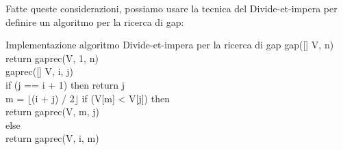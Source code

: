 \begin{problem}
    Fatte queste considerazioni, possiamo usare la tecnica del Divide-et-impera
    per definire un algoritmo per la ricerca di gap:
    \begin{minicode}{Implementazione algoritmo Divide-et-impera per la ricerca di gap}
        \ind{} gap([] V,  n)\\
            return gaprec(V, 1, n)\\

        \ind{} gaprec([] V,  i,  j)\\
            \indf if (j == i + 1) then\hfill{}
                return j\\
            \indf{} m = $\lfloor$(i + j) / 2$\rfloor$\hfill\com{Scelta dell'indice $m\in\,]i,j[$}
            \indf if (V[m] < V[j]) then\\
                return gaprec(V, m, j)\\
            \indf else\\
                return gaprec(V, i, m)
    \end{minicode}
\end{problem}
